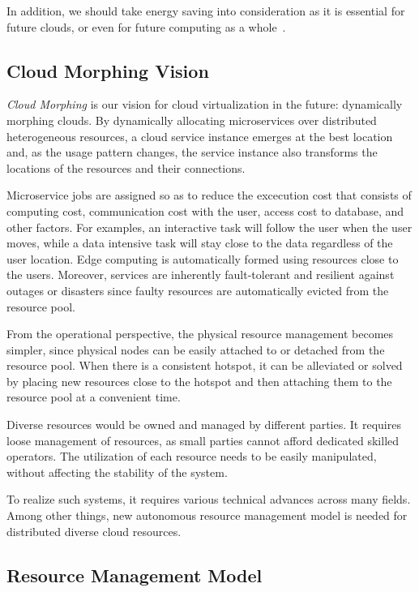 In addition, we should take energy saving into consideration as it is
essential for future clouds, or even for future computing as a
whole~\cite{masanet2020recalibrating}.

\subsection{Cloud Morphing Vision}

{\em Cloud Morphing} is our vision for cloud virtualization in the future:
dynamically morphing clouds.
By dynamically allocating microservices over distributed
heterogeneous resources, a cloud service instance emerges at the best
location and, as the usage pattern changes, the service instance also
transforms the locations of the resources and their connections.

Microservice jobs are assigned so as to reduce the excecution cost that
consists of computing cost, communication cost with the user, access
cost to database, and other factors.
For examples, an interactive task will follow the user when the user
moves, while a data intensive task will stay close to the data
regardless of the user location.
Edge computing is automatically formed using resources close to
the users.
Moreover, services are inherently fault-tolerant and resilient
against outages or disasters since faulty resources are
automatically evicted from the resource pool.

From the operational perspective, the physical resource management
becomes simpler, since physical nodes can be easily attached to or
detached from the resource pool.
When there is a consistent hotspot, it can be alleviated or solved by
placing new resources close to the hotspot and then attaching them to
the resource pool at a convenient time.

Diverse resources would be owned and managed by different parties.
It requires loose management of resources, as small parties cannot
afford dedicated skilled operators.
The utilization of each resource needs to be easily manipulated,
without affecting the stability of the system.

To realize such systems, it requires various technical advances across
many fields.  Among other things, new autonomous resource management
model is needed for distributed diverse cloud resources.

\subsection{Resource Management Model}


